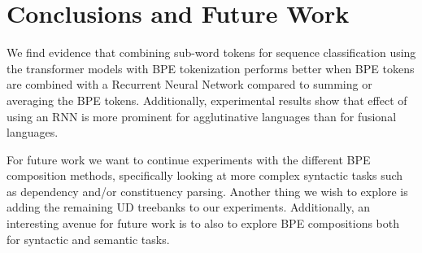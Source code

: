 \documentclass[11pt]{article}
\begin{document}
    \section{Conclusions and Future Work}
    
        We find evidence that combining sub-word tokens for sequence
     classification using the transformer models with BPE tokenization
     performs better when BPE tokens are combined with a Recurrent
     Neural Network compared to summing or averaging the BPE tokens.
         Additionally, experimental results show that effect of using
     an RNN is more prominent for agglutinative languages than for
     fusional languages.

                For future work we want to continue experiments with
     the different BPE composition methods, specifically looking at
     more complex syntactic tasks such as dependency and/or
     constituency parsing. Another thing we wish to explore is adding
     the remaining UD treebanks to our experiments.  Additionally, an
     interesting avenue for future work is to also to explore BPE
     compositions both for syntactic and semantic tasks.
    

	
	
	
\end{document}
